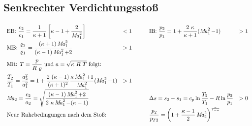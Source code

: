 \subsection{Senkrechter Verdichtungsstoß}
	\setlength{\abovedisplayskip}{-15pt}
		\[ \arraycolsep=0.5em \def\arraystretch{2}
		\begin{array}{llp{1em}ll}
			\text{EB: } \dfrac{c_2}{c_1} = \dfrac{1}{\kappa+1}  \left[ \kappa - 1 + \dfrac{2}{\Mach_1^2}\right]                                    & < 1 &  & \text{IB: } \dfrac{p_2}{p_1} = 1+ \dfrac{2\ \kappa}{\kappa+1} (\Mach_1^2 - 1)                   & > 1 \\
			\text{MB: } \dfrac{\varrho_2}{\varrho_1} = \dfrac{(\kappa+1)\Mach_1^2}  {(\kappa-1)\Mach_1^2 + 2}                                      & > 1 &  &                                                                                                 &     \\
			\text{Mit: }  T = \dfrac{p}{R\ \varrho} \text{ und } a = \sqrt{\kappa\ R\ T} \text{ folgt: }                                           &     &  &                                                                                                 &     \\
			\dfrac{T_2}{T_1} = \dfrac{a_2^2}{a_1^2} = 1 +\dfrac{2\ (\kappa-1)}{(\kappa+1)^2}  \dfrac{\kappa \Mach_1^2+1}{\Mach_1^2}  (\Mach_1^2-1) & > 1 &  &                                                                                                 &     \\
			\Mach_2 = \dfrac{c_2}{a_2} = \sqrt{\dfrac{(\kappa-1) \Mach_1^2 + 2}{2\ \kappa\Mach_1^2 - (\kappa-1)}}                                  &     &  & \Delta s = s_2 - s_1 = c_p \ln\dfrac{T_2}{T_1} - R \ln\dfrac{p_2}{p_1}                          & >0  \\
			\text{Neue Ruhebedingungen nach dem Stoß:}                                                                                             &     &  & \dfrac{p_2}{p_{T2}} = \left( 1+ \dfrac{\kappa -1}{2}\Mach_2^2\right) ^{\frac{\kappa}{1-\kappa}} &
		\end{array} \]

